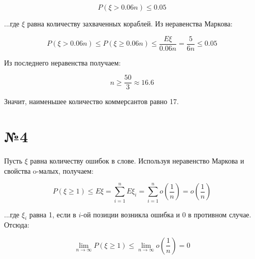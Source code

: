 \documentclass[11pt]{article}
\begin{document}
\begin{sloppypar}
\begin{equation}
  P(\xi > 0.06n) \leq 0.05
\end{equation}

...где $\xi$ равна количеству захваченных кораблей. Из неравенства Маркова:

\begin{equation}
  P(\xi > 0.06n) \leq P(\xi \geq 0.06n) \leq \frac{E\xi}{0.06n} = \frac{5}{6n} \leq 0.05
\end{equation}

Из последнего неравенства получаем:

\begin{equation}
  n \geq \frac{50}{3} \approx 16.6
\end{equation}

Значит, наименьшее количество коммерсантов равно 17.

\section*{№4}
Пусть $\xi$ равна количеству ошибок в слове. Используя неравенство Маркова и свойства o-малых, получаем:

\begin{equation}
  P(\xi \geq 1) \leq E\xi = \sum_{i = 1}^n E\xi_i = \sum_{i = 1}^n o(\frac{1}{n}) = o(\frac{1}{n})
\end{equation}

...где $\xi_i$ равна 1, если в $i$-ой позиции возникла ошибка и 0 в противном случае. Отсюда:

\begin{equation}
  \lim_{n \to \infty} P(\xi \geq 1) \leq \lim_{n \to \infty} o(\frac{1}{n}) = 0
\end{equation}

\end{sloppypar}
\end{document}

